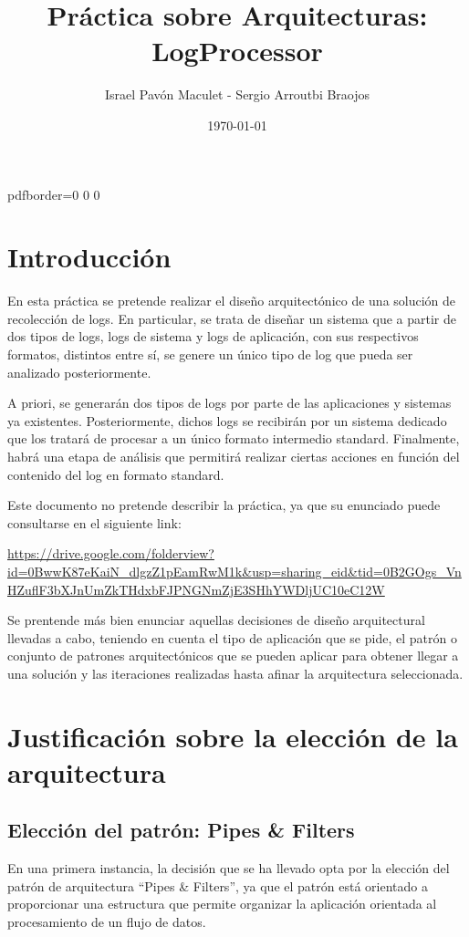 \documentclass[11pt]{article}
\title{\textbf{Práctica sobre Arquitecturas: LogProcessor}}
\author{Israel Pavón Maculet - Sergio Arroutbi Braojos}
\date{\today}
\begin{document}

\hypersetup
{   
pdfborder={0 0 0}
}
   
\maketitle

\pagebreak

\tableofcontents

\pagebreak

\section{Introducción}
En esta práctica se pretende realizar el diseño arquitectónico de una solución de recolección de logs. En particular, se trata de diseñar un sistema que a partir de dos tipos de logs, logs de sistema y logs de aplicación, con sus respectivos formatos, distintos entre sí, se genere un único tipo de log que pueda ser analizado posteriormente.

A priori, se generarán dos tipos de logs por parte de las aplicaciones y sistemas ya existentes. Posteriormente, dichos logs se recibirán por un sistema dedicado que los tratará de procesar a un único formato intermedio standard. Finalmente, habrá una etapa de análisis que permitirá realizar ciertas acciones en función del contenido del log en formato standard.

Este documento no pretende describir la práctica, ya que su enunciado puede consultarse en el siguiente link:

\url{https://drive.google.com/folderview?id=0BwwK87eKaiN_dlgzZ1pEamRwM1k&usp=sharing_eid&tid=0B2GOgs_VnHZuflF3bXJnUmZkTHdxbFJPNGNmZjE3SHhYWDljUC10eC12W}

Se prentende más bien enunciar aquellas decisiones de diseño arquitectural llevadas a cabo, teniendo en cuenta el tipo de aplicación que se pide, el patrón o conjunto de patrones arquitectónicos que se pueden aplicar para obtener llegar a una solución y las iteraciones realizadas hasta afinar la arquitectura seleccionada.

\pagebreak

\section{Justificación sobre la elección de la arquitectura}

\subsection{Elección del patrón: Pipes \& Filters}
En una primera instancia, la decisión que se ha llevado opta por la elección del patrón de arquitectura “Pipes \& Filters”, ya que el patrón está orientado a proporcionar una estructura que permite organizar la aplicación orientada al procesamiento de un flujo de datos.
\end{document}
